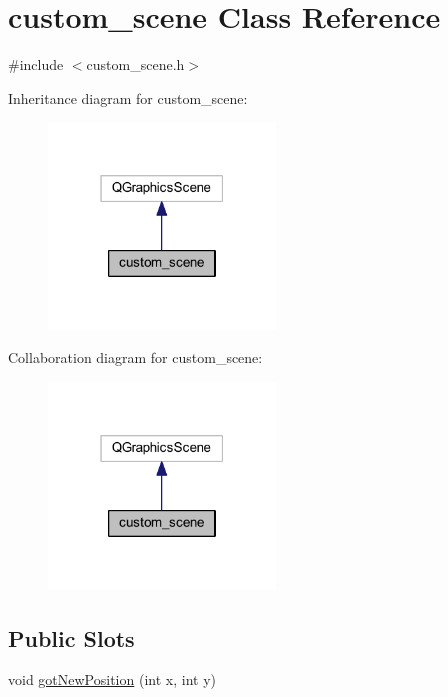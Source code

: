 \hypertarget{classcustom__scene}{}\section{custom\+\_\+scene Class Reference}
\label{classcustom__scene}


{\ttfamily \#include $<$custom\+\_\+scene.\+h$>$}



Inheritance diagram for custom\+\_\+scene\+:
\nopagebreak
\begin{figure}[H]
\begin{center}
\leavevmode
\includegraphics[width=171pt]{classcustom__scene__inherit__graph}
\end{center}
\end{figure}


Collaboration diagram for custom\+\_\+scene\+:
\nopagebreak
\begin{figure}[H]
\begin{center}
\leavevmode
\includegraphics[width=171pt]{classcustom__scene__coll__graph}
\end{center}
\end{figure}
\subsection*{Public Slots}
\begin{DoxyCompactItemize}
\item 
void \hyperlink{classcustom__scene_aeb8481fa02536d26b015722df86f7800}{got\+New\+Position} (int x, int y)
\end{DoxyCompactItemize}


